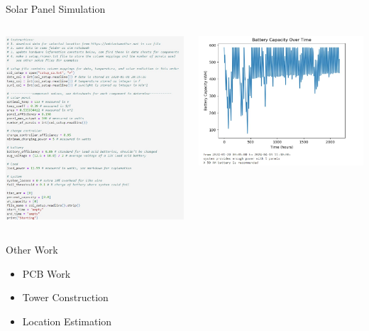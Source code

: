 \begin{frame}{Solar Panel Simulation}
    \centering
    \begin{columns}
        \begin{column}{0.5\textwidth}
            \includegraphics[height=1\textheight,width=1\textwidth,keepaspectratio]{images/rtt/Screenshot 2024-04-22 103941.jpg}
        \end{column}
        \begin{column}{0.5\textwidth}
            \includegraphics[height=1\textheight,width=1\textwidth,keepaspectratio]{images/rtt/Screenshot 2024-04-22 104426.jpg}
        \end{column}
    \end{columns}
\end{frame}
\begin{frame}{Other Work}
    \begin{itemize}
        \item PCB Work
        \item Tower Construction
        \item Location Estimation
    \end{itemize}
\end{frame}

